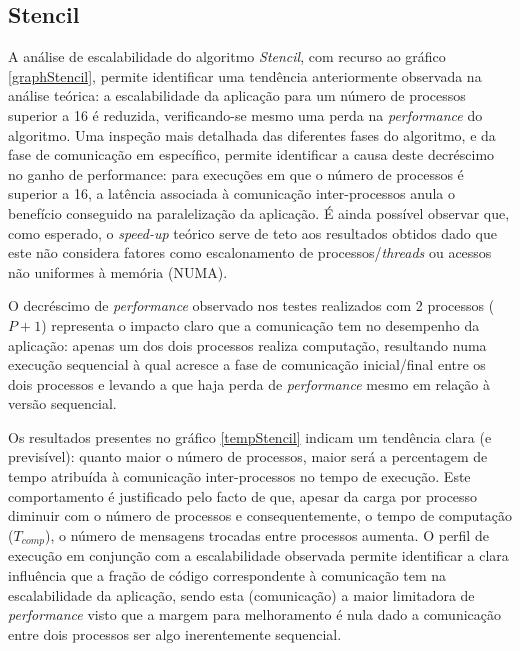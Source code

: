 \documentclass{article}
\begin{document}
\subsection{Stencil}
A análise de escalabilidade do algoritmo \textit{Stencil}, com recurso ao gráfico \ref{graphStencil}, permite identificar 
uma tendência anteriormente observada na análise teórica: a escalabilidade da aplicação para um número de processos superior a 
16 é reduzida, verificando-se mesmo uma perda na \textit{performance} do algoritmo. Uma inspeção mais detalhada das diferentes fases 
do algoritmo, e da fase de comunicação em específico, permite identificar a causa deste decréscimo no ganho de 
performance: para execuções em que o número de processos é superior a 16, a latência associada à comunicação 
inter-processos anula o benefício conseguido na paralelização da aplicação. \label{mpi_loss_scalability}
É ainda possível observar que, como esperado, o \textit{speed-up} teórico serve de teto aos resultados obtidos dado que este não
considera fatores como escalonamento de processos/\textit{threads} ou acessos não uniformes à memória (NUMA). 

O decréscimo de \textit{performance} observado nos testes realizados com 2 processos ($P+1$) representa o impacto claro que a 
comunicação tem no desempenho da aplicação: apenas um dos dois processos realiza computação, resultando numa execução sequencial 
à qual acresce a fase de comunicação inicial/final entre os dois processos e levando a que haja perda de \textit{performance} mesmo
em relação à versão sequencial.

Os resultados presentes no gráfico \ref{tempStencil} indicam um tendência clara (e previsível): quanto maior o número de processos, 
maior será a percentagem de tempo atribuída à comunicação inter-processos no tempo de execução. Este comportamento é justificado pelo facto de que, apesar da carga por
processo diminuir com o número de processos e consequentemente, o tempo de computação ($T_{comp}$), o número
de mensagens trocadas entre processos aumenta.
O perfil de execução em conjunção com a escalabilidade observada permite identificar a clara influência que 
a fração de código correspondente à comunicação tem na escalabilidade da aplicação, sendo esta (comunicação) a maior 
limitadora de \textit{performance} visto que a margem para melhoramento é nula dado a comunicação entre dois
processos ser algo inerentemente sequencial. 
\end{document}
